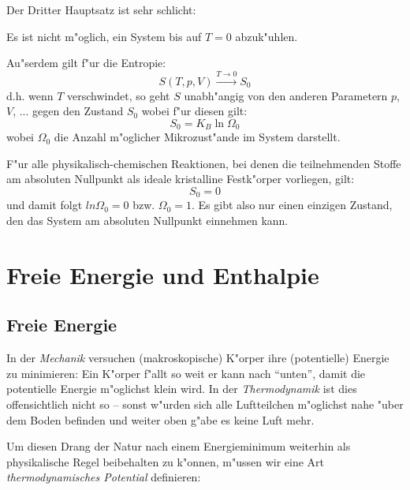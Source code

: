 Der Dritter Hauptsatz ist sehr schlicht:
\begin{Wichtig}
Es ist nicht m"oglich, ein System bis auf $T =0$ abzuk"uhlen.
\end{Wichtig}
Au"serdem gilt f"ur die Entropie:
$$
S(T,p,V) \stackrel{T \to 0}{\to} S_0
$$
d.h. wenn $T$ verschwindet, so geht $S$ unabh"angig von den anderen
Parametern $p$, $V$, ... gegen den Zustand $S_0$ wobei f"ur diesen
gilt:
$$
S_0 =K_B \ln \Omega_0 
$$
wobei $\Omega_0$ die Anzahl m"oglicher Mikrozust"ande im System
darstellt.

F"ur alle physikalisch-chemischen Reaktionen, bei denen die
teilnehmenden Stoffe am absoluten Nullpunkt als ideale kristalline
Festk"orper vorliegen, gilt:
$$
S_0 = 0
$$
und damit folgt $ln \Omega_0 = 0$ bzw. $\Omega_0 = 1$. Es gibt also
nur einen einzigen Zustand, den das System am absoluten Nullpunkt
einnehmen kann.









\section{Freie Energie und Enthalpie}



\subsection{Freie Energie}
\label{kap_freie-energie}



In der \emph{Mechanik} versuchen (makroskopische) K"orper ihre
(potentielle) Energie zu minimieren: Ein K"orper f"allt so weit er kann
nach "`unten"', damit die potentielle Energie m"oglichst klein wird. In
der \emph{Thermodynamik} ist dies offensichtlich nicht so -- sonst
w"urden sich alle Luftteilchen m"oglichst nahe "uber dem Boden befinden
und weiter oben g"abe es keine Luft mehr.

Um diesen Drang der Natur nach einem Energieminimum weiterhin als
physikalische Regel beibehalten zu k"onnen, m"ussen wir eine Art
\emph{thermodynamisches Potential} definieren:

